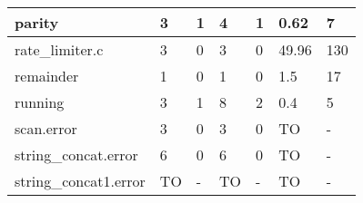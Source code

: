 \begin{table}
{\begin{tabular}{|l|l|l|l|l|l|l|}
    parity                                                   & 3                                     & 1                                          & 4                                     & 1                                          & 0.62                                                            & 7                                        \\ \hline
    rate\_limiter.c                                          & 3                                     & 0                                          & 3                                     & 0                                          & 49.96                                                           & 130                                      \\ \hline
    remainder                                                & 1                                     & 0                                          & 1                                     & 0                                          & 1.5                                                             & 17                                       \\ \hline
    running                                                  & 3                                     & 1                                          & 8                                     & 2                                          & 0.4                                                             & 5                                        \\ \hline
    scan.error                                               & 3                                     & 0                                          & 3                                     & 0                                          & TO                                                              & -                                        \\ \hline
    string\_concat.error                                     & 6                                     & 0                                          & 6                                     & 0                                          & TO                                                              & -                                        \\ \hline
    string\_concat1.error                                    & TO                                    & -                                          & TO                                    & -                                          & TO                                                              & -                                        \\ \hline

\end{tabular}}
\end{table}
